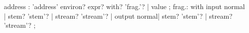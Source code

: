 \begin{rail}
address : 'address' environ? expr? with? 'frag.'? |
                    value
                 ;
frag.: with input normal |
                stem? 'stem'? |
                stream? 'stream'? |
                output normal|
                stem? 'stem'? |
                stream? 'stream'?
                 ;
\end{rail}

